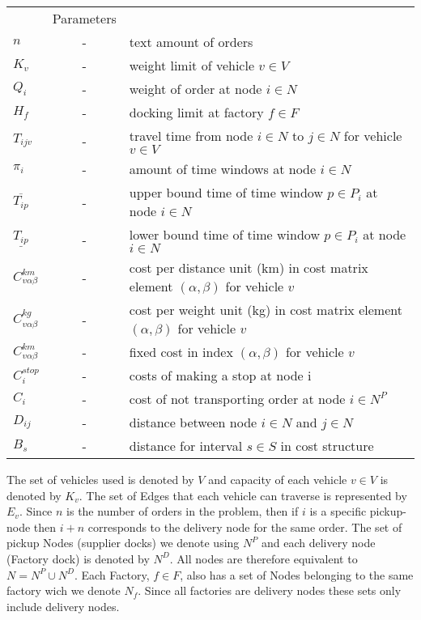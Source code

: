 \documentclass[a4paper,10pt]{article}
\begin{document}
\begin{tabular}{l c l }
    			&Parameters 							\\ 
	$n    	$	&-& text amount of orders 					\\
	$K_v  	$	&-& weight limit of vehicle $v\in V$	 			\\
    	$Q_i  	$	&-& weight of order at node $i\in N$				\\
	$H_f  	$	&-& docking limit at factory $f\in F$				\\
	$T_{ijv}$ 	&-& travel time from node $i\in N$ to $j\in N$ for vehicle 
			    $v\in V$	 						\\
	$\pi_i	$	&-& amount of time windows at node $i\in N$			\\ 
$\overline{T_{ip}} $	&-& upper bound time of time window $p\in P_i$ at node $i\in N$ \\
$\underline{T_{ip}}$	&-& lower bound time of time window $p\in P_i$ at node $i\in N$ \\
	$C^{km}_{v\alpha\beta}	$	&-& cost per distance unit (km) in cost matrix element $(\alpha, \beta)$ for vehicle $v$	\\
	$C^{kg}_{v\alpha\beta}	$	&-& cost per weight unit (kg) in cost matrix element $(\alpha, \beta)$ for vehicle $v$	\\
	$C^{km}_{v\alpha\beta}	$	&-& fixed cost in index $(\alpha, \beta)$ for vehicle $v$	\\
	$C^{stop}_i $	&-& costs of making a stop at node i 	\\
	$C_i	$	&-& cost of not transporting order at node $i\in N^P$ 		\\
	$D_{ij}	$ 	&-& distance between node $i\in N$ and  $j\in N$			\\
    	$B_s 	$	&-& distance for interval $s\in S$ in cost structure		\\
\end{tabular}
\linebreak
\linebreak
\par
The set of vehicles used is denoted by $V$ and capacity of each vehicle $v \in V$ is denoted by $K_v$.
The set of Edges that each vehicle can traverse is represented by $E_v$. 
Since $n$ is the number of orders in the problem, then if $i$ is a specific pickup-node then $i+n$ corresponds to the delivery node for the same order.
The set of pickup Nodes (supplier docks) we denote using $N^P$ and each delivery node (Factory dock) is denoted by $N^D$. 
All nodes are therefore equivalent to $N = N^P \cup N^D$. 
Each Factory, $f \in F$, also has a set of Nodes belonging to the same factory wich we denote $N_f$. Since all factories are delivery nodes these sets only include delivery nodes.
\end{document}

